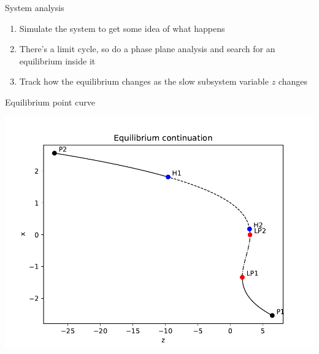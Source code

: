 \documentclass[presentation]{beamer}
\begin{document}
\begin{frame}[label={sec:orgd63820c}]{System analysis}
\begin{enumerate}
\item Simulate the system to get some idea of what happens
\item There's a limit cycle, so do a phase plane analysis and search for an equilibrium inside it
\item Track how the equilibrium changes as the slow subsystem variable \(z\) changes
\end{enumerate}
\end{frame}

\begin{frame}[label={sec:orgeb515b6}]{Equilibrium point curve}
\begin{center}
\includegraphics[height=.9\textheight]{./epc-1.pdf}
\end{center}
\end{frame}
\end{document}

